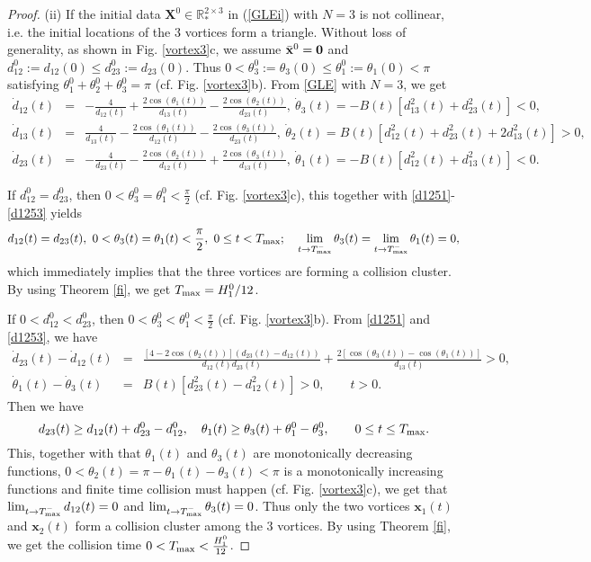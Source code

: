 \documentclass{aims}
\theoremstyle{plain}
\theoremstyle{definition}
\newcommand{\bx}{{\mathbf x}}
\newcommand{\bX}{{\mathbf X}}
\newcommand{\nn}{\nonumber}
\newcommand{\be} {\begin{equation}}
\newcommand{\ee}{\end{equation}}
\newcommand{\bea}{\begin{eqnarray}}
\newcommand{\eea}{\end{eqnarray} }
\begin{document}
\begin{proof}
(ii) If the initial data $\bX^0\in {\mathbb R}_*^{2\times 3}$ in (\ref{GLEi}) with $N=3$ is not collinear, i.e. the initial locations of the $3$ vortices form a triangle.
Without loss of generality, as shown in Fig. \ref{vortex3}c, we assume $\bar\bx^0={\bf 0}$ and $d_{12}^0:=d_{12}(0)\le d_{23}^0:=d_{23}(0)$.
Thus $0<\theta_3^0:=\theta_3(0)\le \theta_1^0:=\theta_1(0)<\pi$ satisfying
$\theta_1^0+\theta_2^0+\theta_3^0=\pi$ (cf. Fig. \ref{vortex3}b).
From \eqref{GLE} with $N=3$, we get
\bea\label{d1251}
\dot{d}_{12}(t)&=&-\frac{4}{d_{12}(t)}+\frac{2\cos(\theta_{1}(t))}{d_{13}(t)}
-\frac{2\cos(\theta_2(t))}{d_{23}(t)},\
\dot\theta_{3}(t)=-B(t)\left[d_{13}^2(t)+d_{23}^2(t)\right]<0,\\
\label{d1252}
\dot{d}_{13}(t)&=&\frac{4}{d_{13}(t)}-\frac{2\cos(\theta_{1}(t))}{d_{12}(t)}
-\frac{2\cos(\theta_3(t))}{d_{23}(t)},\
\dot\theta_{2}(t)=B(t)\left[d_{12}^2(t)+d_{23}^2(t)+2d_{13}^2(t)\right]>0,\qquad\\
\label{d1253}
\dot{d}_{23}(t)&=&-\frac{4}{d_{23}(t)}-\frac{2\cos(\theta_{2}(t))}{d_{12}(t)}
+\frac{2\cos(\theta_3(t))}{d_{13}(t)},\
\dot\theta_{1}(t)=-B(t)\left[d_{12}^2(t)+d_{13}^2(t)\right]<0.
\eea

If $d_{12}^0=d_{23}^0$, then $0<\theta_3^0=\theta_1^0<\frac{\pi}{2}$ (cf.
Fig. \ref{vortex3}c),
this together with \eqref{d1251}-\eqref{d1253} yields
\be
d_{12}(t)=d_{23}(t), \ 0<\theta_3(t)=\theta_1(t)<\frac{\pi}{2}, \ 0\le t<T_{\rm max}; \quad \lim_{t\to T_{\rm max}^-}\theta_3(t)=
\lim_{t\to T_{\rm max}^-}\theta_1(t)=0, \nn
\ee
which immediately implies that the three vortices are forming
a collision cluster. By using Theorem \ref{fi},
we get $T_{\rm max}=H^0_1/12$.

If $0<d_{12}^0<d_{23}^0$, then $0<\theta_3^0<\theta_1^0<\frac{\pi}{2}$ (cf.
Fig. \ref{vortex3}b). From \eqref{d1251} and \eqref{d1253}, we have
\bea
\dot{d}_{23}(t)-\dot{d}_{12}(t)&=&\frac{[4-2\cos(\theta_{2}(t))](d_{23}(t)
-d_{12}(t))}{d_{12}(t)d_{23}(t)}
+\frac{2[\cos(\theta_{3}(t))-\cos
(\theta_{1}(t))]}{d_{13}(t)}>0,\qquad \nn \\
\dot\theta_{1}(t)-\dot\theta_{3}(t)&=&B(t)\left[d_{23}^2(t)-d_{12}^2(t)\right]>0,
\qquad t>0.\nn
\eea
Then we have
\be
d_{23}(t)\ge d_{12}(t)+d_{23}^0-d_{12}^0,\quad
\theta_{1}(t)\ge \theta_{3}(t)+\theta_{1}^0-\theta_{3}^0, \qquad
0\le t\le T_{\rm max}.\nn
\ee
This, together with that $\theta_1(t)$ and $\theta_3(t)$ are monotonically decreasing functions, $0<\theta_2(t)=\pi-\theta_1(t)-\theta_3(t)<\pi$
is a monotonically increasing functions
and finite time collision must happen (cf.
Fig. \ref{vortex3}c),
we get that $\lim_{t\to T_{\rm max}^-}d_{12}(t)=0$ and
$\lim_{t\to T_{\rm max}^-}\theta_3(t)=0$. Thus only the two vortices
$\mathbf x_1(t)$ and $\mathbf x_2(t)$ form a collision cluster among the
$3$ vortices. By using
Theorem \ref{fi}, we get the collision time $0<T_{\rm max}< \frac{H_1^0}{12}$.
\end{proof}
\end{document}
